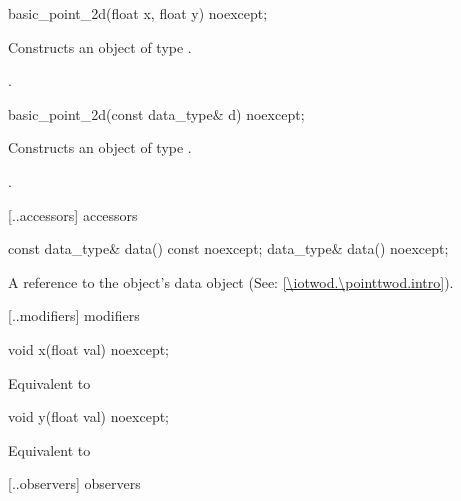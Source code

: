 %
\begin{itemdecl}
basic_point_2d(float x, float y) noexcept;
\end{itemdecl}
\begin{itemdescr}
\pnum
\effects
Constructs an object of type .

\pnum
\postconditions
{}.
\end{itemdescr}

%
\begin{itemdecl}
basic_point_2d(const data_type& d) noexcept;
\end{itemdecl}
\begin{itemdescr}
\pnum
\effects
Constructs an object of type .

\pnum
\postconditions
{}.
\end{itemdescr}

 [\iotwod.\pointtwod.accessors]{ accessors}

%
\begin{itemdecl}
const data_type& data() const noexcept;
data_type& data() noexcept;
\end{itemdecl}
\begin{itemdescr}
\pnum
\returns
A reference to the  object's data object (See: \ref{\iotwod.\pointtwod.intro}).
\end{itemdescr}

 [\iotwod.\pointtwod.modifiers]{ modifiers}

%
\begin{itemdecl}
void x(float val) noexcept;
\end{itemdecl}
\begin{itemdescr}
\pnum
\effects
Equivalent to 
\end{itemdescr}

%
\begin{itemdecl}
void y(float val) noexcept;
\end{itemdecl}
\begin{itemdescr}
\pnum
\effects
Equivalent to 
\end{itemdescr}

 [\iotwod.\pointtwod.observers]{ observers}

